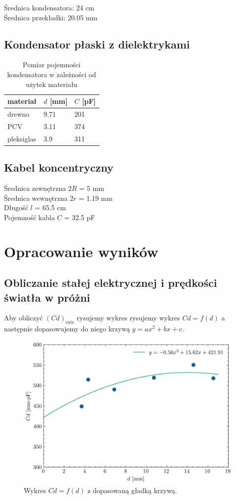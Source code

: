 \documentclass{fizykalab}
\newcommand{\mm}{\ensuremath{\text{mm}}}
\newcommand{\cde}{\ensuremath{(Cd)_\text{extr}}}
\begin{document}
Średnica kondensatora: 24 cm \\
Średnica przekładki: 20.05 \mm

\subsection{Kondensator płaski z dielektrykami}
\begin{table}[H]
    \centering
    \caption{Pomiar pojemności kondensatora w zależności od użytek materiału }
    \begin{tabular}{|C{3cm}|C{3cm}|C{3cm}|}
        \hline
        materiał & $d$ [mm] & $C$ [pF]\\ \hline
        drewno & 9.71 & 201\\ \hline
        PCV & 3.11 & 374\\ \hline
        pleksiglas & 3.9 & 311\\ \hline
    \end{tabular}
    \label{tab:capacity-measure-material}
\end{table}

\subsection{Kabel koncentryczny}

Średnica zewnętrzna $2R$ = 5 mm \\
Średnica wewnętrzna $2r$ = 1.19 mm \\
Długość $l$ = 65.5 cm \\
Pojemność kabla $C$ = 32.5 pF \\

\section{Opracowanie wyników}
\subsection{Obliczanie stałej elektrycznej i prędkości światła w próżni}
Aby obliczyć $\cde$ rysujemy wykres rysujemy wykres $Cd = f(d)$ 
a następnie dopasowujemy do niego krzywą $y = ax^2 + bx + c$.
\begin{figure}[H]
    \centering
    \includegraphics[width=0.75\linewidth]{wykres.png}
    \caption{Wykres $Cd = f(d)$ z dopasowaną gładką krzywą.}
\end{figure}
\end{document}
